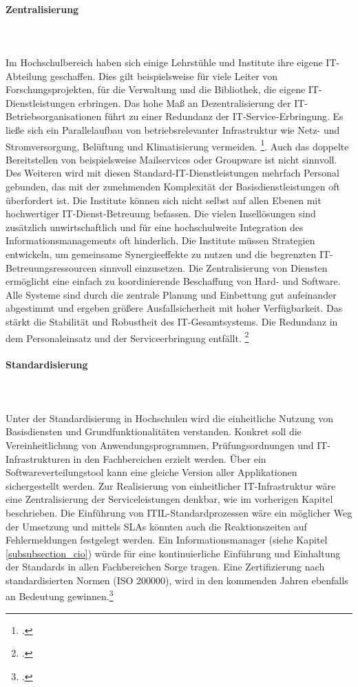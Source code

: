\paragraph{Zentralisierung}\mbox{}\\\\
Im Hochschulbereich haben sich einige Lehrstühle und Institute ihre eigene IT-Abteilung geschaffen. Dies gilt beispielsweise für viele Leiter von Forschungsprojekten, für die Verwaltung und die Bibliothek, die eigene IT-Dienstleistungen erbringen. Das hohe Maß an Dezentralisierung der IT-Betriebsorganisationen führt zu einer Redundanz der IT-Service-Erbringung. Es ließe sich ein Parallelaufbau von betriebsrelevanter Infrastruktur wie Netz- und Stromversorgung, Belüftung und Klimatisierung vermeiden.
\footcite[Vgl.][22]{stratmann_it_2013}. Auch das doppelte Bereitstellen von beispielsweise Mailservices oder Groupware ist nicht sinnvoll. Des Weiteren wird mit diesen Standard-IT-Dienstleistungen mehrfach Personal gebunden, das mit der zunehmenden Komplexität der Basisdienstleistungen oft überfordert ist. 
Die Institute können sich nicht selbst auf allen Ebenen mit hochwertiger IT-Dienst-Betreuung befassen. Die vielen Insellösungen sind zusätzlich unwirtschaftlich und für eine hochschulweite Integration des Informationsmanagements oft hinderlich. Die Institute müssen Strategien entwickeln, um gemeinsame Synergieeffekte zu nutzen und die begrenzten IT-Betreuungsressourcen sinnvoll einzusetzen.
Die Zentralisierung von Diensten ermöglicht eine einfach zu koordinierende Beschaffung von Hard- und Software. Alle Systeme sind durch die zentrale Planung und Einbettung gut aufeinander abgestimmt und ergeben größere Ausfallsicherheit mit hoher Verfügbarkeit. Das stärkt die Stabilität und Robustheit des IT-Gesamtsystems. Die Redundanz in dem Personaleinsatz und der Serviceerbringung entfällt. \footcite[Vgl.][22]{moenkediek_2006}


\paragraph{Standardisierung}\mbox{}\\\\
Unter der Standardisierung in Hochschulen wird die einheitliche Nutzung von Basisdiensten und Grundfunktionalitäten verstanden. Konkret soll die Vereinheitlichung von Anwendungsprogrammen, Prüfungsordnungen und IT-Infrastrukturen in den Fachbereichen erzielt werden. Über ein Softwareverteilungstool kann eine gleiche Version aller Applikationen sichergestellt werden. Zur Realisierung von einheitlicher IT-Infrastruktur wäre eine Zentralisierung der Serviceleistungen denkbar, wie im vorherigen Kapitel beschrieben. Die Einführung von ITIL-Standardprozessen wäre ein möglicher Weg der Umsetzung und mittels SLAs könnten auch die Reaktionszeiten auf Fehlermeldungen festgelegt werden. Ein Informationsmanager (siehe Kapitel \ref{subsubsection_cio}) würde für eine kontinuierliche Einführung und Einhaltung der Standards in allen Fachbereichen Sorge tragen. Eine Zertifizierung nach standardisierten Normen (ISO 200000), wird in den kommenden Jahren ebenfalls an Bedeutung gewinnen.\footcite[Vgl.][168]{breiter_implementierung_2011}


